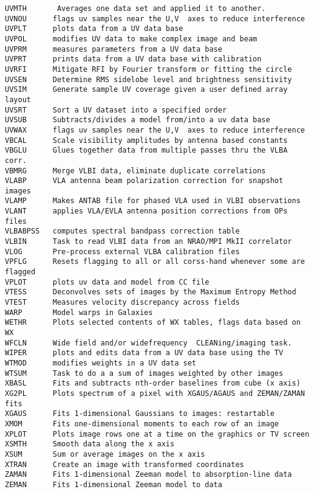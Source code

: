 \begin{verbatim}
UVMTH       Averages one data set and applied it to another.
UVNOU      flags uv samples near the U,V  axes to reduce interference
UVPLT      plots data from a UV data base
UVPOL      modifies UV data to make complex image and beam
UVPRM      measures parameters from a UV data base
UVPRT      prints data from a UV data base with calibration
UVRFI      Mitigate RFI by Fourier transform or fitting the circle
UVSEN      Determine RMS sidelobe level and brightness sensitivity
UVSIM      Generate sample UV coverage given a user defined array layout
UVSRT      Sort a UV dataset into a specified order
UVSUB      Subtracts/divides a model from/into a uv data base
UVWAX      flags uv samples near the U,V  axes to reduce interference
VBCAL      Scale visibility amplitudes by antenna based constants
VBGLU      Glues together data from multiple passes thru the VLBA corr.
VBMRG      Merge VLBI data, eliminate duplicate correlations
VLABP      VLA antenna beam polarization correction for snapshot images
VLAMP      Makes ANTAB file for phased VLA used in VLBI observations
VLANT      applies VLA/EVLA antenna position corrections from OPs files
VLBABPSS   computes spectral bandpass correction table
VLBIN      Task to read VLBI data from an NRAO/MPI MkII correlator
VLOG       Pre-process external VLBA calibration files
VPFLG      Resets flagging to all or all corss-hand whenever some are flagged
VPLOT      plots uv data and model from CC file
VTESS      Deconvolves sets of images by the Maximum Entropy Method
VTEST      Measures velocity discrepancy across fields
WARP       Model warps in Galaxies
WETHR      Plots selected contents of WX tables, flags data based on WX
WFCLN      Wide field and/or widefrequency  CLEANing/imaging task.
WIPER      plots and edits data from a UV data base using the TV
WTMOD      modifies weights in a UV data set
WTSUM      Task to do a a sum of images weighted by other images
XBASL      Fits and subtracts nth-order baselines from cube (x axis)
XG2PL      Plots spectrum of a pixel with XGAUS/AGAUS and ZEMAN/ZAMAN fits
XGAUS      Fits 1-dimensional Gaussians to images: restartable
XMOM       Fits one-dimensional moments to each row of an image
XPLOT      Plots image rows one at a time on the graphics or TV screen
XSMTH      Smooth data along the x axis
XSUM       Sum or average images on the x axis
XTRAN      Create an image with transformed coordinates
ZAMAN      Fits 1-dimensional Zeeman model to absorption-line data
ZEMAN      Fits 1-dimensional Zeeman model to data
\end{verbatim}\eve

